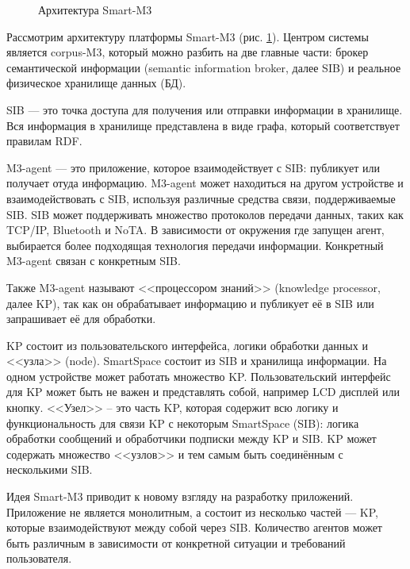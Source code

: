 \begin{figure}[h]
\centerline{
}
\caption{Архитектура Smart-M3}
\label{smart-m3}
\end{figure}
Рассмотрим архитектуру платформы Smart-M3 (рис. \ref{smart-m3}). Центром системы является corpus-M3, который можно разбить на две главные части: брокер семантической информации (semantic information broker, далее SIB) и реальное физическое хранилище данных (БД).

SIB --- это точка доступа для получения или отправки информации в хранилище. Вся информация в хранилище представлена в виде графа, который соответствует правилам RDF.

M3-agent --- это приложение, которое взаимодействует с SIB: публикует или получает отуда информацию. M3-agent может находиться на другом устройстве и взаимодействовать с SIB, используя различные средства связи, поддерживаемые SIB.
SIB может поддерживать множество протоколов передачи данных, таких как TCP/IP, Bluetooth и NoTA. В зависимости от окружения где запущен агент, выбирается более подходящая технология передачи информации.
Конкретный M3-agent связан с конкретным SIB. 

Также M3-agent называют <<процессором знаний>> (knowledge processor, далее KP), так как он обрабатывает информацию и публикует её в SIB или запрашивает её для обработки.

KP состоит из пользовательского интерфейса, логики обработки данных и <<узла>> (node). SmartSpace состоит из SIB и хранилища информации. На одном устройстве может работать множество KP. Пользовательский интерфейс для KP может быть не важен и представлять собой, например LCD дисплей или кнопку. <<Узел>> -- это часть KP, которая содержит всю логику и функциональность для связи KP с некоторым SmartSpace (SIB): логика обработки сообщений и обработчики подписки между KP и SIB. KP может содержать множество <<узлов>> и тем самым быть соединённым с несколькими SIB.

Идея Smart-M3 приводит к новому взгляду на разработку приложений. Приложение не является монолитным, а состоит из несколько частей --- KP, которые взаимодействуют между собой через SIB. Количество агентов может быть различным в зависимости от конкретной ситуации и требований пользователя. 

